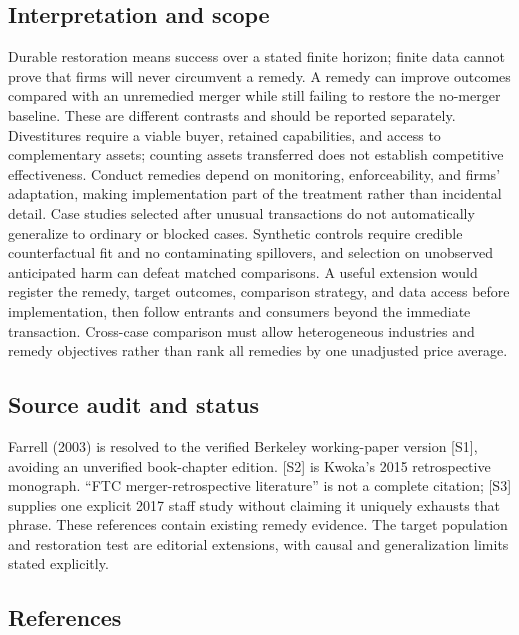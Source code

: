 \documentclass[11pt,a4paper]{article}
\begin{document}
\subsection*{Interpretation and scope}

Durable restoration means success over a stated finite horizon; finite data cannot prove that firms will never circumvent a remedy. A remedy can improve outcomes compared with an unremedied merger while still failing to restore the no-merger baseline. These are different contrasts and should be reported separately. Divestitures require a viable buyer, retained capabilities, and access to complementary assets; counting assets transferred does not establish competitive effectiveness. Conduct remedies depend on monitoring, enforceability, and firms' adaptation, making implementation part of the treatment rather than incidental detail. Case studies selected after unusual transactions do not automatically generalize to ordinary or blocked cases. Synthetic controls require credible counterfactual fit and no contaminating spillovers, and selection on unobserved anticipated harm can defeat matched comparisons. A useful extension would register the remedy, target outcomes, comparison strategy, and data access before implementation, then follow entrants and consumers beyond the immediate transaction. Cross-case comparison must allow heterogeneous industries and remedy objectives rather than rank all remedies by one unadjusted price average.

\subsection*{Source audit and status}

Farrell (2003) is resolved to the verified Berkeley working-paper version [S1], avoiding an unverified book-chapter edition. [S2] is Kwoka's 2015 retrospective monograph. ``FTC merger-retrospective literature'' is not a complete citation; [S3] supplies one explicit 2017 staff study without claiming it uniquely exhausts that phrase. These references contain existing remedy evidence. The target population and restoration test are editorial extensions, with causal and generalization limits stated explicitly.

\subsection*{References}
\end{document}
